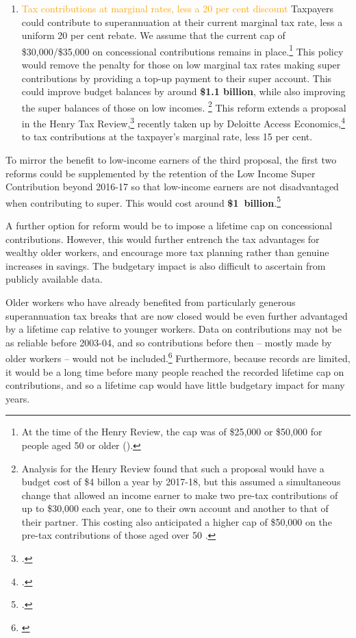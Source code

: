 \documentclass{grattanAlpha}
\begin{document}
\begin{enumerate}
\item 
\textcolor{Orange}{Tax contributions at marginal rates, less a 20 per cent discount} \quad
Taxpayers could contribute to superannuation at their current marginal tax rate, less a uniform 20 per cent rebate. We assume that the current cap of \$30,000/\$35,000 on concessional contributions remains in place.\footnote{At the time of the Henry Review, the cap was of \$25,000 or \$50,000 for people aged 50 or older (\textcite[][100]{HenryTaxReview2010}).}  This policy would remove the penalty for those on low marginal tax rates making super contributions by providing a top-up payment to their super account. This could improve budget balances by around \textbf{\$1.1 billion}, while also improving the super balances of those on low incomes.%
\footnote{Analysis for the Henry Review found that such a proposal would have a budget cost of \$4 billon a year by 2017-18, but this assumed a simultaneous change that allowed an income earner to make two pre-tax contributions of up to \$30,000 each year, one to their own account and another to that of their partner. This costing also anticipated a higher cap of \$50,000 on the pre-tax contributions of those aged over 50 \textcite{Treasury2010SuperAdditionalMaterial} \textcite[][95]{HenryTaxReview2010}.}  
This reform extends a proposal in the Henry Tax Review,\footcite[][102]{Treasury2010IGR}  recently taken up by Deloitte Access Economics,\footcite{Deloitte2015TaxReformSheddingLight}  to tax contributions at the taxpayer’s marginal rate, less 15 per cent.
\end{enumerate}

To mirror the benefit to low-income earners of the third proposal, the first two reforms could be supplemented by the retention of the Low Income Super Contribution beyond 2016-17 so that low-income earners are not disadvantaged when contributing to super. This would cost around \textbf{\$1~billion}.\footcite[][Table~2.16, p.~206]{Treasury2013PortfolioBudgetStatement1314}

A further option for reform would be to impose a lifetime cap on concessional contributions. However, this would further entrench the tax advantages for wealthy older workers, and encourage more tax planning rather than genuine increases in savings. The budgetary impact is also difficult to ascertain from publicly available data. 

Older workers who have already benefited from particularly generous superannuation tax breaks that are now closed would be even further advantaged by a lifetime cap relative to younger workers. Data on contributions may not be as reliable before 2003-04, and so contributions before then – mostly made by older workers – would not be included.\footnote{\textcites{SuperContrTaxRegs1997}{ATO2003}{ATO2008}{ATO2014g}{ATO2014h}} Furthermore, because records are limited, it would be a long time before many people reached the recorded lifetime cap on contributions, and so a lifetime cap would have little budgetary impact for many years.
\end{document}
